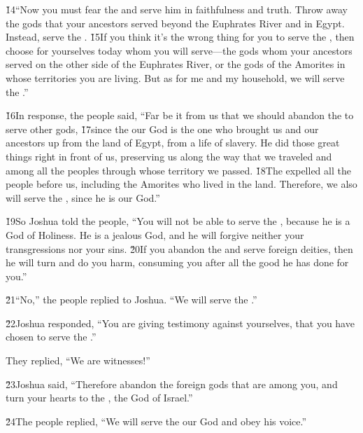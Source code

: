 \v{14}``Now you must fear the  and serve him in faithfulness and truth. Throw away the gods that your ancestors served beyond the Euphrates River and in Egypt. Instead, serve the . \v{15}If you think it's the wrong thing for you to serve the , then choose for yourselves today whom you will serve---the gods whom your ancestors served on the other side of the Euphrates River, or the gods of the Amorites in whose territories you are living. But as for me and my household, we will serve the .''

\v{16}In response, the people said, ``Far be it from us that we should abandon the  to serve other gods, \v{17}since the  our God is the one who brought us and our ancestors up from the land of Egypt, from a life of slavery. He did those great things right in front of us, preserving us along the way that we traveled and among all the peoples through whose territory we passed. \v{18}The  expelled all the people before us, including the Amorites who lived in the land. Therefore, we also will serve the , since he is our God.''

\v{19}So Joshua told the people, ``You will not be able to serve the , because he is a God of Holiness. He is a jealous God, and he will forgive neither your transgressions nor your sins. \v{20}If you abandon the  and serve foreign deities, then he will turn and do you harm, consuming you after all the good he has done for you.''

\v{21}``No,'' the people replied to Joshua. ``We will serve the .''

\v{22}Joshua responded, ``You are giving testimony against yourselves, that you have chosen to serve the .''

They replied, ``We are witnesses!''

\v{23}Joshua said, ``Therefore abandon the foreign gods that are among you, and turn your hearts to the , the God of Israel.''

\v{24}The people replied, ``We will serve the  our God and obey his voice.''

